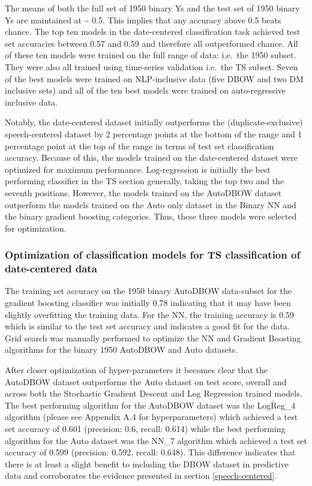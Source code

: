 \documentclass[11pt,preprint, authoryear]{elsarticle}
\numberwithin{equation}{section}
\numberwithin{figure}{section}
\numberwithin{table}{section}
\begin{document}
The means of both the full set of 1950 binary Ys and the test set of
1950 binary Ys are maintained at \textasciitilde{} 0.5. This implies
that any accuracy above 0.5 beats chance. The top ten models in the
date-centered classification task achieved test set accuracies between
0.57 and 0.59 and therefore all outperformed chance. All of these ten
models were trained on the full range of data: i.e.~the 1950 subset.
They were also all trained using time-series validation i.e.~the TS
subset. Seven of the best models were trained on NLP-inclusive data
(five DBOW and two DM inclusive sets) and all of the ten best models
were trained on auto-regressive inclusive data.

Notably, the date-centered dataset initially outperforms the
(duplicate-exclusive) speech-centered dataset by 2 percentage points at
the bottom of the range and 1 percentage point at the top of the range
in terms of test set classification accuracy. Because of this, the
models trained on the date-centered dataset were optimized for maximum
performance. Log-regression is initially the best performing classifier
in the TS section generally, taking the top two and the seventh
positions. However, the models trained on the AutoDBOW dataset
outperform the models trained on the Auto only dataset in the Binary NN
and the binary gradient boosting categories. Thus, these three models
were selected for optimization.

\hypertarget{optimization-of-classification-models-for-ts-classification-of-date-centered-data}{%
\subsubsection{Optimization of classification models for TS
classification of date-centered
data}\label{optimization-of-classification-models-for-ts-classification-of-date-centered-data}}

The training set accuracy on the 1950 binary AutoDBOW data-subset for
the gradient boosting classifier was initially 0.78 indicating that it
may have been slightly overfitting the training data. For the NN, the
training accuracy is 0.59 which is similar to the test set accuracy and
indicates a good fit for the data. Grid search was manually performed to
optimize the NN and Gradient Boosting algorithms for the binary 1950
AutoDBOW and Auto datasets.

After closer optimization of hyper-parameters it becomes clear that the
AutoDBOW dataset outperforms the Auto dataset on test score, overall and
across both the Stochastic Gradient Descent and Log Regression trained
models. The best performing algorithm for the AutoDBOW dataset was the
LogReg\_4 algorithm (please see Appendix A.4 for hyperparameters) which
achieved a test set accuracy of 0.601 (precision: 0.6, recall: 0.614)
while the best performing algorithm for the Auto dataset was the NN\_7
algorithm which achieved a test set accuracy of 0.599 (precision: 0.592,
recall: 0.648). This difference indicates that there is at least a
slight benefit to including the DBOW dataset in predictive data and
corroborates the evidence presented in section \ref{speech-centered}.
\end{document}
